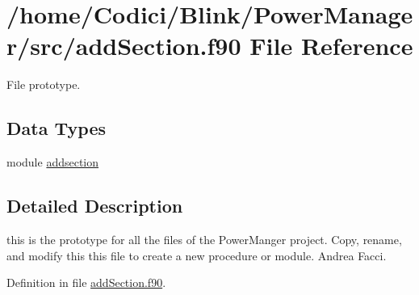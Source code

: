 \hypertarget{add_section_8f90}{\section{/home/\-Codici/\-Blink/\-Power\-Manager/src/add\-Section.f90 File Reference}
\label{add_section_8f90}
}


File prototype.  


\subsection*{Data Types}
\begin{DoxyCompactItemize}
\item 
module \hyperlink{classaddsection}{addsection}
\end{DoxyCompactItemize}


\subsection{Detailed Description}
this is the prototype for all the files of the Power\-Manger project. Copy, rename, and modify this this file to create a new procedure or module.  Andrea Facci. 

Definition in file \hyperlink{add_section_8f90_source}{add\-Section.\-f90}.

